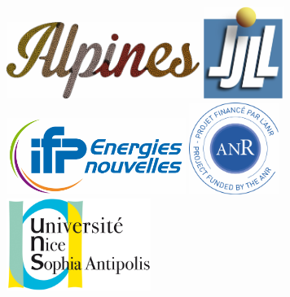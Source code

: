 \vspace{2cm}
\begin{figure}[h!]

\hspace{2.25cm}\includegraphics[height=2.5cm]{../logo/logo_alpines.pdf}
\hspace{0.5cm}\includegraphics[height=3cm]{../logo/logo_ljll.pdf}\\[10pt]

\hspace{0.5cm}\includegraphics[height=2.5cm]{../logo/logo_ifpen.pdf}
\hspace{0.5cm}\includegraphics[height=3cm]{../logo/logo_anr.pdf}
\hspace{0.5cm}\includegraphics[height=3cm]{../logo/logo_unice.pdf}

\end{figure}

